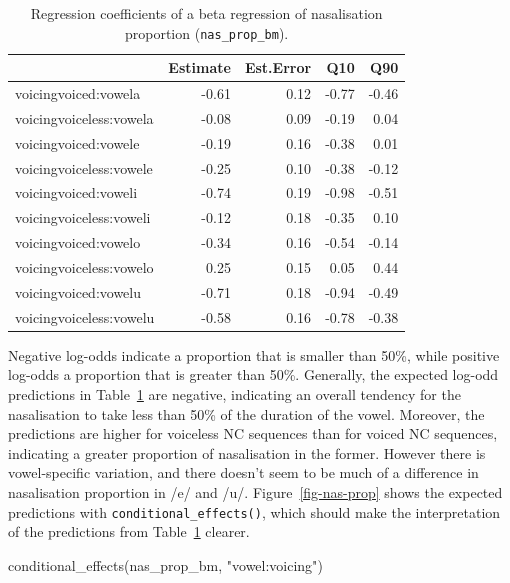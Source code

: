 \documentclass[
  authoryear,
  preprint,
  3p]{elsarticle}
\newenvironment{Shaded}{\begin{snugshade}}{\end{snugshade}}
\newcommand{\FunctionTok}[1]{\textcolor[rgb]{0.28,0.35,0.67}{#1}}
\newcommand{\NormalTok}[1]{\textcolor[rgb]{0.00,0.23,0.31}{#1}}
\newcommand{\StringTok}[1]{\textcolor[rgb]{0.13,0.47,0.30}{#1}}
\begin{document}
\begin{longtable}[]{@{}lrrrr@{}}

\caption{\label{tbl-nas-prop-fixef}Regression coefficients of a beta
regression of nasalisation proportion (\texttt{nas\_prop\_bm}).}

\tabularnewline

\toprule\noalign{}
& Estimate & Est.Error & Q10 & Q90 \\
\midrule\noalign{}
\endhead
\bottomrule\noalign{}
\endlastfoot
voicingvoiced:vowela & -0.61 & 0.12 & -0.77 & -0.46 \\
voicingvoiceless:vowela & -0.08 & 0.09 & -0.19 & 0.04 \\
voicingvoiced:vowele & -0.19 & 0.16 & -0.38 & 0.01 \\
voicingvoiceless:vowele & -0.25 & 0.10 & -0.38 & -0.12 \\
voicingvoiced:voweli & -0.74 & 0.19 & -0.98 & -0.51 \\
voicingvoiceless:voweli & -0.12 & 0.18 & -0.35 & 0.10 \\
voicingvoiced:vowelo & -0.34 & 0.16 & -0.54 & -0.14 \\
voicingvoiceless:vowelo & 0.25 & 0.15 & 0.05 & 0.44 \\
voicingvoiced:vowelu & -0.71 & 0.18 & -0.94 & -0.49 \\
voicingvoiceless:vowelu & -0.58 & 0.16 & -0.78 & -0.38 \\

\end{longtable}

Negative log-odds indicate a proportion that is smaller than 50\%, while
positive log-odds a proportion that is greater than 50\%. Generally, the
expected log-odd predictions in Table~\ref{tbl-nas-prop-fixef} are
negative, indicating an overall tendency for the nasalisation to take
less than 50\% of the duration of the vowel. Moreover, the predictions
are higher for voiceless NC sequences than for voiced NC sequences,
indicating a greater proportion of nasalisation in the former. However
there is vowel-specific variation, and there doesn't seem to be much of
a difference in nasalisation proportion in /e/ and /u/.
Figure~\ref{fig-nas-prop} shows the expected predictions with
\texttt{conditional\_effects()}, which should make the interpretation of
the predictions from Table~\ref{tbl-nas-prop-fixef} clearer.

\begin{Shaded}
\begin{Highlighting}[]
\FunctionTok{conditional\_effects}\NormalTok{(nas\_prop\_bm, }\StringTok{"vowel:voicing"}\NormalTok{)}
\end{Highlighting}
\end{Shaded}
\end{document}
